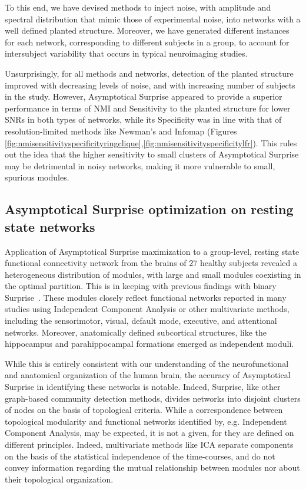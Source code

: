 To this end, we have devised methods to inject noise, with amplitude and spectral distribution that mimic those of experimental noise, into networks with a well defined planted structure. Moreover, we have generated different instances for each network, corresponding to different subjects in a group, to account for intersubject variability that occurs in typical neuroimaging studies. 

Unsurprisingly, for all methods and networks, detection of the planted structure improved with decreasing levels of noise, and with increasing number of subjects in the study.
However, Asymptotical Surprise appeared to provide a superior performance in terms of NMI and Sensitivity to the planted structure for lower SNRs in both types of networks, while its Specificity was in line with that of resolution-limited methods like Newman's and Infomap (Figures \ref{fig:nmisensitivityspecificityringclique},\ref{fig:nmisensitivityspecificitylfr}).
This rules out the idea that the higher sensitivity to small clusters of Asymptotical Surprise may be detrimental in noisy networks, making it more vulnerable to small, spurious modules.

\subsection{Asymptotical Surprise optimization on resting state networks}
Application of Asymptotical Surprise maximization to a group-level, resting state functional connectivity network from the brains of $27$ healthy subjects revealed a heterogeneous distribution of modules, with large and small modules coexisting in the optimal partition.
This is in keeping with previous findings with binary Surprise~\cite{nicolini2016}.
These modules closely reflect functional networks reported in many studies using Independent Component Analysis or other multivariate methods, including the sensorimotor, visual, default mode, executive, and attentional networks.
Moreover, anatomically defined subcortical structures, like the hippocampus and parahippocampal formations emerged as independent moduli.

While this is entirely consistent with our understanding of the neurofunctional and anatomical organization of the human brain, the accuracy of Asymptotical Surprise in identifying these networks is notable.
Indeed, Surprise, like other graph-based community detection methods, divides networks into disjoint clusters of nodes on the basis of topological criteria.
While a correspondence between topological modularity and functional networks identified by, e.g. Independent Component Analysis, may be expected, it is not a given, for they are defined on different principles. Indeed, multivariate methods like ICA separate components on the basis of the statistical independence of the time-courses, and do not convey information regarding the mutual relationship between modules nor about their topological organization.

